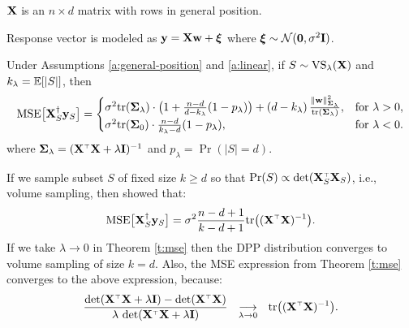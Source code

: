 \documentclass[12pt]{sty/colt2019/colt2018-arxiv}
\begin{document}
\begin{assumption}\label{a:general-position}
  $\mathbf X$ is an $n\times d$ matrix with rows in general position.
\end{assumption}
\begin{assumption}\label{a:linear}
  Response vector is modeled as $\mathbf y = \mathbf X\mathbf w+\boldsymbol\xi$ where
$\boldsymbol\xi\sim\mathcal{N}(\mathbf 0,\sigma^2\mathbf I)$.
\end{assumption}
\begin{theorem}\label{t:mse}
Under Assumptions \ref{a:general-position} and \ref{a:linear}, if $S\sim{\mathrm{VS}}_\lambda(\mathbf X)$ and $k_{\lambda}=\mathbb E[|S|]$, then
\begin{align*}
  {\mathrm{MSE}\big[\mathbf X_S^\dagger\mathbf y_S\big]} =
\begin{cases}
\sigma^2\mathrm{tr}(\mathbf{\Sigma}_\lambda)\cdot\big(1 +
\frac{n-d}{d-k_\lambda} (1-p_\lambda)\big)+
    (d-k_\lambda)\,\frac{\|\mathbf w\|_{\mathbf{\Sigma}_\lambda}^2}{\mathrm{tr}(\mathbf{\Sigma}_\lambda)},&\text{for
    }\lambda>0,\\
\sigma^2\mathrm{tr}(\mathbf{\Sigma}_0)\cdot \frac{n-d}{k_\lambda-d}(1-p_\lambda),&\text{for
}\lambda<0.
\end{cases}
\end{align*}
where $\Sigmab_\lambda=(\X^\top\X+\lambda\I)^{-1}$ and $p_\lambda=\Pr(|S|=d)$.
\end{theorem}
\begin{remark}\label{r:sqinv}
  If we sample subset $S$ of fixed size $k\geq d$ so that $\Pr(S)\propto
  \det(\X_S^\top\X_S)$, i.e., volume sampling, then \cite{unbiased-estimates-journal} showed that:
  \begin{align*}
    \MSE{\X_S^\dagger\y_S} = \sigma^2\frac{n-d+1}{k-d+1}\tr\big((\X^\top\X)^{-1}\big).
  \end{align*}
If we take $\lambda\rightarrow 0$ in Theorem \ref{t:mse} then the DPP
distribution converges to volume sampling of size $k=d$. Also,
the MSE expression from Theorem \ref{t:mse} converges to the above
expression, because:
\begin{align*}
  \frac{\det(\X^\top\X+\lambda\I)-\det(\X^\top\X)}{\lambda\,\det(\X^\top\X+\lambda\I)}
\ \ \underset{\lambda\rightarrow 0}\longrightarrow \ \ \tr\big((\X^\top\X)^{-1}\big).
\end{align*}
\end{remark}
\end{document}
